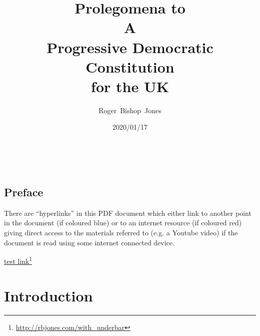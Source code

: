 \documentclass[10pt,titlepage]{book}
\title{\LARGE\bf Prolegomena to \\A \\Progressive Democratic Constitution \\for the UK}
\author{Roger~Bishop~Jones}
\date{\small 2020/01/17}
\newcommand{\ignore}[1]{}
\newcommand{\hreg}[2]{\href{#1}{#2}\footnote{\url{#1}}}
\begin{document}
\frontmatter

                               
\begin{titlepage}
\maketitle





\end{titlepage}

\ \

\ignore{
\begin{centering}
{}
\end{centering}
}%

\setcounter{tocdepth}{2}
{\parskip-0pt\tableofcontents}


\mainmatter

\pagebreak

\section*{Preface}


There are ``hyperlinks'' in this PDF document which either link to another point in the document  (if coloured blue) or to an internet resource  (if coloured red) giving direct access to the materials referred to (e.g. a Youtube video) if the document is read using some internet connected device.

\hreg{http://rbjones.com/with_underbar}{test link}

\chapter{Introduction}
\end{document}
